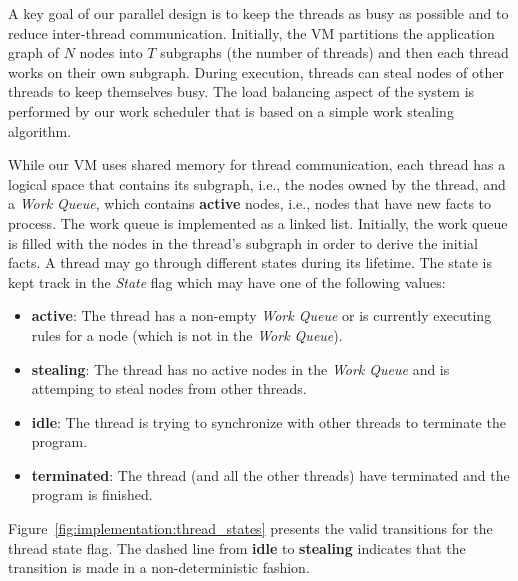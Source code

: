 A key goal of our parallel design is to keep the threads as busy as possible and
to reduce inter-thread communication. Initially, the VM partitions the
application graph of $N$ nodes into $T$ subgraphs (the number of threads) and
then each thread works on their own subgraph. During execution, threads can
steal nodes of other threads to keep themselves busy. The load balancing aspect
of the system is performed by our work scheduler that is based on a simple work
stealing algorithm.

While our VM uses shared memory for thread communication, each
thread has a logical space that contains its subgraph, i.e., the nodes owned by
the thread, and a \emph{Work Queue}, which contains \textbf{active} nodes, i.e.,
nodes that have new facts to process.  The work queue is implemented as a linked
list. Initially, the work queue is filled with the nodes in the thread's
subgraph in order to derive the initial facts. A thread may go through different
states during its lifetime. The state is kept track in the \emph{State} flag
which may have one of the following values:

\begin{itemize}

   \item \textbf{active}: The thread has a non-empty \emph{Work Queue} or is
      currently executing rules for a node (which is not in the \emph{Work
      Queue}).

   \item \textbf{stealing}: The thread has no active nodes in the \emph{Work
      Queue} and is attemping to steal nodes from other
      threads.

   \item \textbf{idle}: The thread is trying to synchronize with other threads
      to terminate the program.
   
   \item \textbf{terminated}: The thread (and all the other threads) have
      terminated and the program is finished.

\end{itemize}

Figure~\ref{fig:implementation:thread_states} presents the valid transitions for
the thread state flag. The dashed line from \textbf{idle} to \textbf{stealing}
indicates that the transition is made in a non-deterministic fashion.

